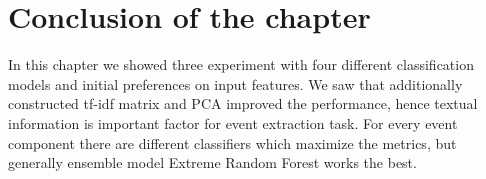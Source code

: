 \section*{Conclusion of the chapter}

In this chapter we showed three experiment with four different classification models and initial preferences on input features. We saw that additionally constructed tf-idf matrix and PCA improved the performance, hence textual information is important factor for event extraction task. For every event component there are different classifiers which maximize the metrics, but generally ensemble model Extreme Random Forest works the best.
